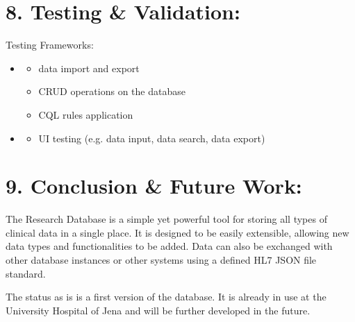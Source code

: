 \documentclass[a4paper,10pt,english]{sphinxmanual}
\begin{document}
\chapter{8. Testing \& Validation:}
\label{\detokenize{TechnicalDetails:testing-validation}}
\sphinxAtStartPar
Testing Frameworks:
\begin{itemize}
\item {} \begin{description}
\begin{itemize}
\item {} 
\sphinxAtStartPar
data import and export

\item {} 
\sphinxAtStartPar
CRUD operations on the database

\item {} 
\sphinxAtStartPar
CQL rules application

\end{itemize}

\end{description}

\item {} \begin{description}
\begin{itemize}
\item {} 
\sphinxAtStartPar
UI testing (e.g. data input, data search, data export)

\end{itemize}

\end{description}

\end{itemize}


\chapter{9. Conclusion \& Future Work:}
\label{\detokenize{TechnicalDetails:conclusion-future-work}}
\sphinxAtStartPar
The Research Database is a simple yet powerful tool for storing all types of clinical data in a single place. It is designed to be easily extensible, allowing new data types and functionalities to be added. Data can also be exchanged with other database instances or other systems using a defined HL7 JSON file standard.

\sphinxAtStartPar
The status as is is a first version of the database. It is already in use at the University Hospital of Jena and will be further developed in the future.
\end{document}
